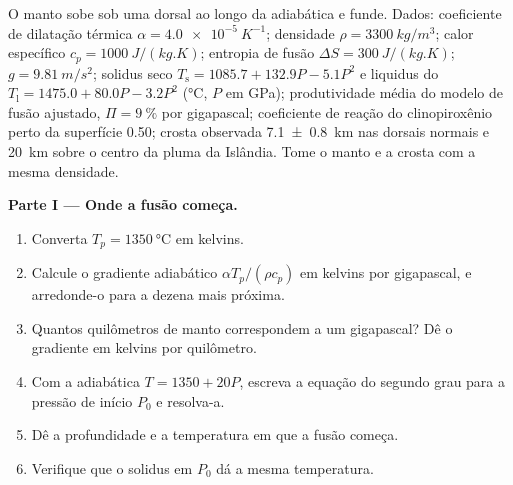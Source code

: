 \begin{problem}
\label{pb:b2:mantle-melting:1}
O manto sobe sob uma dorsal ao longo da adiabática e funde. Dados: coeficiente de dilatação
térmica $\alpha = \qty{4.0e-5}{K^{-1}}$; densidade $\rho = \qty{3300}{kg/m^3}$;
calor específico $c_p = \qty{1000}{J/(kg.K)}$; entropia de fusão $\Delta S =
\qty{300}{J/(kg.K)}$; $g = \qty{9.81}{m/s^2}$; solidus seco $T_{\mathrm s} =
1085.7 + 132.9P - 5.1P^2$ e liquidus do  $T_{\mathrm l} = 1475.0 +
80.0P - 3.2P^2$ (\unit{\celsius}, $P$ em \unit{GPa}); produtividade média do
modelo de fusão ajustado, $\Pi = \qty{9}{\percent}$ por gigapascal; coeficiente de reação
do clinopiroxênio perto da superfície 0.50; crosta observada \qty[uncertainty-mode=separate]{7.1 \pm 0.8}{km}
nas dorsais normais e \qty{20}{km} sobre o centro da pluma da Islândia. Tome o manto
e a crosta com a mesma densidade.

\noindent\textbf{Parte I --- Onde a fusão começa.}
\begin{enumerate}
\item Converta $T_p = \qty{1350}{\celsius}$ em kelvins.
\item Calcule o gradiente adiabático $\alpha T_p/(\rho c_p)$ em kelvins por
gigapascal, e arredonde-o para a dezena mais próxima.
\item Quantos quilômetros de manto correspondem a um gigapascal? Dê o gradiente em
kelvins por quilômetro.
\item Com a adiabática $T = 1350 + 20P$, escreva a equação do segundo grau para a pressão de início
$P_0$ e resolva-a.
\item Dê a profundidade e a temperatura em que a fusão começa.
\item Verifique que o solidus em $P_0$ dá a mesma temperatura.
\end{enumerate}


\end{problem}
